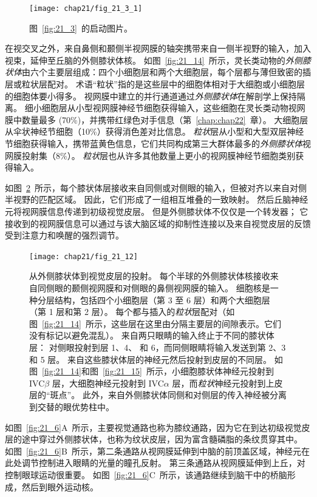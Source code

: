 \begin{figure}[htbp]
	\centering
	\texttt{[image: chap21/fig\_21\_3\_1]}
	\caption{图~\ref{fig:21_3}~的启动图片。}
	\label{fig:21_3_1}
\end{figure}


在视交叉之外，来自鼻侧和颞侧半视网膜的轴突携带来自一侧半视野的输入，加入视束，延伸至丘脑的外侧膝状体核。
如图~\ref{fig:21_14}~所示，灵长类动物的\textit{外侧膝状体}由六个主要层组成：四个小细胞层和两个大细胞层，每个层都与薄但致密的插层或粒状层配对。
术语“粒状”指的是这些层中的细胞体相对于大细胞或小细胞层的细胞体要小得多。
视网膜中建立的并行通道通过\textit{外侧膝状体}在解剖学上保持隔离。
细小细胞层从小型视网膜神经节细胞获得输入，这些细胞在灵长类动物视网膜中数量最多 (70\%)，并携带红绿色对手信息（第~\ref{chap:chap22}~章）。
大细胞层从伞状神经节细胞（10\%）获得消色差对比信息。
\textit{粒状}层从小型和大型双层神经节细胞获得输入，携带蓝黄色信息，它们共同构成第三大群体最多的\textit{外侧膝状体}视网膜投射集（8\%）。
\textit{粒状}层也从许多其他数量上更小的视网膜神经节细胞类别获得输入。


如图~\ref{fig:21_12}~所示，每个膝状体层接收来自同侧或对侧眼的输入，但被对齐以来自对侧半视野的匹配区域。
因此，它们形成了一组相互堆叠的一致映射。
然后丘脑神经元将视网膜信息传递到初级视觉皮层。
但是外侧膝状体不仅仅是一个转发器；
它接收到的视网膜信息可以通过与该大脑区域的抑制性连接以及来自视觉皮层的反馈受到注意力和唤醒的强烈调节。


\begin{figure}[htbp]
	\centering
	\texttt{[image: chap21/fig\_21\_12]}
	\caption{从外侧膝状体到视觉皮层的投射。
		每个半球的外侧膝状体核接收来自同侧眼的颞侧视网膜和对侧眼的鼻侧视网膜的输入。
		细胞核是一种分层结构，包括四个小细胞层（第 3 至 6 层）和两个大细胞层（第 1 层和第 2 层）。
		每个都与插入的\textit{粒状}层配对（如图~\ref{fig:21_14}~所示，这些层在这里由分隔主要层的间隙表示。它们没有标记以避免混乱）。
		来自两只眼睛的输入终止于不同的膝状体层：
		对侧眼投射到层 1、4、 和 6，而同侧眼睛将输入发送到第 2、3 和 5 层。
		来自这些膝状体层的神经元然后投射到皮层的不同层。
		如图~\ref{fig:21_14}和图~\ref{fig:21_15}~所示，小细胞膝状体神经元投射到 IVC$\beta$ 层，大细胞神经元投射到 IVC$\alpha$ 层，而\textit{粒状}神经元投射到上皮层的“斑点”。
		此外，来自外侧膝状体同侧和对侧层的传入神经被分离到交替的眼优势柱中。}
	\label{fig:21_12}
\end{figure}


如图~\ref{fig:21_6}A~所示，主要视觉通路也称为膝纹通路，因为它在到达初级视觉皮层的途中穿过外侧膝状体，也称为纹状皮层，因为富含髓磷脂的条纹贯穿其中。
如图~\ref{fig:21_6}B~所示，第二条通路从视网膜延伸到中脑的前顶盖区域，神经元在此处调节控制进入眼睛的光量的瞳孔反射。
第三条通路从视网膜延伸到上丘，对控制眼球运动很重要。
如图~\ref{fig:21_6}C~所示，该通路继续到脑干中的桥脑形成，然后到眼外运动核。


